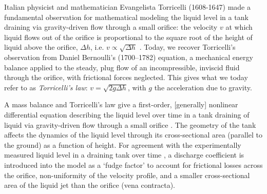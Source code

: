 \documentclass[openacc]{rsproca_new}%
\begin{document}


Italian physicist and mathematician Evangelista Torricelli (1608-1647) made a fundamental observation for mathematical modeling the liquid level in a tank draining via gravity-driven flow through a small orifice: the velocity $v$ at which liquid flows out of the orifice is proportional to the square root of the height of liquid above the orifice, $\Delta h$, i.e. $v\propto \sqrt{\Delta h}$ \cite{mills1982newton}.
Today, we recover Torricelli's observation from Daniel Bernoulli's (1700–1782) equation, a mechanical energy balance applied to the steady, plug flow of an incompressible, inviscid fluid through the orifice, with frictional forces neglected. This gives what we today refer to as \emph{Torricelli's law}: $v=\sqrt{2 g \Delta h}$, with $g$ the acceleration due to gravity. \cite{d2021torricelli}

A mass balance and Torricelli's law give a first-order, [generally] nonlinear differential equation describing the liquid level over time in a tank draining of liquid via gravity-driven flow through a small orifice \cite{groetsch1993inverse,seborg2016process}.
The geometry of the tank affects the dynamics of the liquid level through its cross-sectional area (parallel to the ground) as a function of height.
For agreement with the experimentally measured liquid level in a draining tank over time \cite{de2000pin,blasone2015discharge,wadhwa2021study,liu2008drainage}, a discharge coefficient is introduced into the model as a `fudge factor' to
account for frictional losses across the orifice, non-uniformity of the velocity profile, and a smaller cross-sectional area of the liquid jet than the orifice (vena contracta).
\cite{teoman2022discharge,hicks2014determining,blasone2015discharge}
\end{document}
